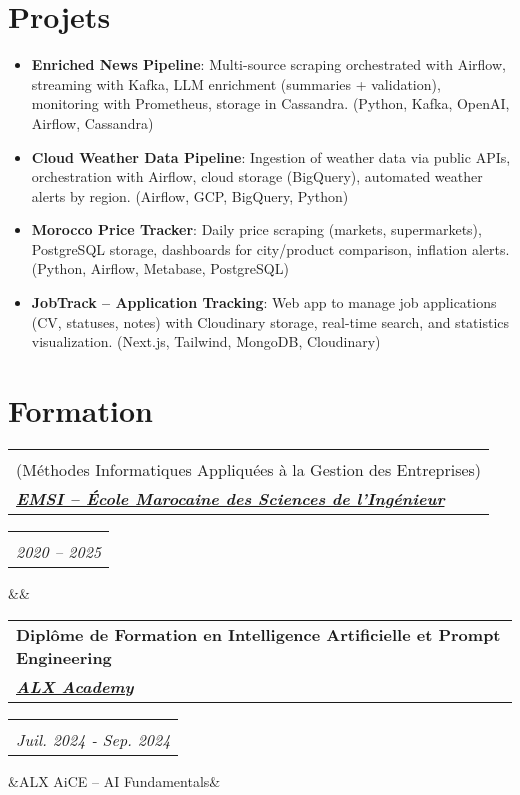 \documentclass[10pt,a4paper,sans]{moderncv}
\makeatletter
\newcommand*{\customcventry}[7][.10em]{%
\begin{tabular}{@{}l}
    {\bfseries #4} \\
    {\itshape #3}
\end{tabular}
\hfill
\begin{tabular}{l@{}}
    {\bfseries #5} \\
    {\itshape #2}
\end{tabular}
\ifx&#7&%
\else{\\
\begin{minipage}{\maincolumnwidth}%
    \footnotesize#7%
\end{minipage}}\fi%
\par\addvspace{#1}
}
\makeatother
\begin{document}
\section{\fontsize{11.2}{13}\selectfont Projets}
\vspace{-4pt}
\begin{itemize}[leftmargin=0.3cm, itemsep=-2pt, topsep=0pt, partopsep=0pt, parsep=0pt]
    \item \textbf{Enriched News Pipeline}: Multi-source scraping orchestrated with Airflow, streaming with Kafka, LLM enrichment (summaries + validation), monitoring with Prometheus, storage in Cassandra. (Python, Kafka, OpenAI, Airflow, Cassandra)
    \item \textbf{Cloud Weather Data Pipeline}: Ingestion of weather data via public APIs, orchestration with Airflow, cloud storage (BigQuery), automated weather alerts by region. (Airflow, GCP, BigQuery, Python)
    \item \textbf{Morocco Price Tracker}: Daily price scraping (markets, supermarkets), PostgreSQL storage, dashboards for city/product comparison, inflation alerts. (Python, Airflow, Metabase, PostgreSQL)
    \item \textbf{JobTrack – Application Tracking}: Web app to manage job applications (CV, statuses, notes) with Cloudinary storage, real-time search, and statistics visualization. (Next.js, Tailwind, MongoDB, Cloudinary)
\end{itemize}


\vspace{-18pt}
\section{\fontsize{11.2}{13}\selectfont Formation}
\vspace{-4pt}
  \customcventry{2020 -- 2025}{\href{https://emsi.ma}{\textbf{EMSI – École Marocaine des Sciences de l’Ingénieur}}}{Diplôme d’Ingénieur en Informatique et Réseaux option MIAGE \\ (Méthodes Informatiques Appliquées à la Gestion des Entreprises)}{}{}{}
  \customcventry{Juil. 2024 ‐ Sep. 2024}{\href{https://www.alxafrica.com}{\textbf{ALX Academy}}}{Diplôme de Formation en Intelligence Artificielle et Prompt Engineering}{}{}{ALX AiCE – AI Fundamentals}


\vspace{-18pt}
\end{document}
